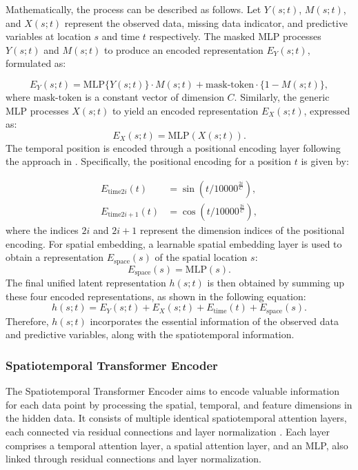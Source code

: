 \documentclass[review]{elsarticle}
\begin{document}
Mathematically, the process can be described as follows. Let $Y(s;t)$, $M(s;t)$, and $X(s;t)$ represent the observed data, missing data indicator, and predictive variables at location $s$ and time $t$ respectively. The masked MLP processes $Y(s;t)$ and $M(s;t)$ to produce an encoded representation $E_{Y}(s;t)$, formulated as: 

\begin{equation}
    E_{Y}(s;t) = \text{MLP}\{Y(s;t)\}\cdot M(s;t) + \text{mask-token} \cdot \{1-M(s;t)\},
\end{equation}
where $\text{mask-token}$ is a constant vector of dimension $C$. Similarly, the generic MLP processes $X(s;t)$ to yield an encoded representation $E_{X}(s;t)$, expressed as:
\begin{equation}
	E_{X}(s;t) = \text{MLP}(X(s;t)).
\end{equation}
The temporal position is encoded through a positional encoding layer following the approach in \citep{vaswani2017attention}. Specifically, the positional encoding for a position $t$ is given by:

\begin{align}
    E_{\text{time}2i}(t) &= \sin\left(t/10000^{\frac{2i}{C}}\right),\\
    E_{\text{time}2i+1}(t) &= \cos\left(t/{10000^{\frac{2i}{C}}}\right),
\end{align}
where the indices $2i$ and $2i+1$ represent the dimension indices of the positional encoding.
For spatial embedding, a learnable spatial embedding layer is used to obtain a representation $E_{\text{space}}(s)$ of the spatial location $s$:
\begin{equation}
	E_{\text{space}}(s) = \text{MLP}(s).
\end{equation}
The final unified latent representation $h(s;t)$ is then obtained by summing up these four encoded representations, as shown in the following equation:
\begin{equation}
	h(s;t) = E_{Y}(s;t) + E_{X}(s;t) + E_{\text{time}}(t) + E_{\text{space}}(s).
\end{equation}
 Therefore, $h(s;t)$ incorporates the essential information of the observed data and predictive variables, along with the spatiotemporal information.



\subsubsection*{Spatiotemporal Transformer Encoder}
The Spatiotemporal Transformer Encoder aims to encode valuable information for each data point by processing the spatial, temporal, and feature dimensions in the hidden data. It consists of multiple identical spatiotemporal attention layers, each connected via residual connections and layer normalization  \citep{ba2016layer}. Each layer comprises a temporal attention layer, a spatial attention layer, and an MLP, also linked through residual connections and layer normalization.
\end{document}
